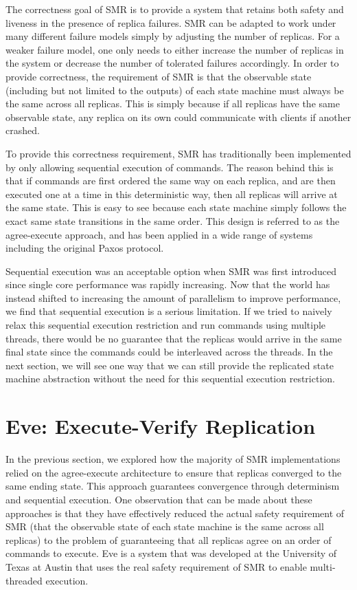 \documentclass[11pt, oneside]{report}
\begin{document}
The correctness goal of SMR is to provide a system that retains both safety and liveness in the presence of replica failures. 
SMR can be adapted to work under many different failure models simply by adjusting the number of replicas. 
For a weaker failure model, one only needs to either increase the number of replicas in the system or decrease the number of tolerated failures accordingly. 
In order to provide correctness, the requirement of SMR is that the observable state (including but not limited to the outputs) of each state machine must always be the same across all replicas. 
This is simply because if all replicas have the same observable state, any replica on its own could communicate with clients if another crashed.

To provide this correctness requirement, SMR has traditionally been implemented by only allowing sequential execution of commands. 
The reason behind this is that if commands are first ordered the same way on each replica, and are then executed one at a time in this deterministic way, then all replicas will arrive at the same state. 
This is easy to see because each state machine simply follows the exact same state transitions in the same order. 
This design is referred to as the agree-execute approach, and has been applied in a wide range of systems including the original Paxos protocol.

Sequential execution was an acceptable option when SMR was first introduced since single core performance was rapidly increasing. 
Now that the world has instead shifted to increasing the amount of parallelism to improve performance, we find that sequential execution is a serious limitation. 
If we tried to naively relax this sequential execution restriction and run commands using multiple threads, there would be no guarantee that the replicas would arrive in the same final state since the commands could be interleaved across the threads. 
In the next section, we will see one way that we can still provide the replicated state machine abstraction without the need for this sequential execution restriction. 
 

\section{Eve: Execute-Verify Replication}

In the previous section, we explored how the majority of SMR implementations relied on the agree-execute architecture to ensure that replicas converged to the same ending state. 
This approach guarantees convergence through determinism and sequential execution. 
One observation that can be made about these approaches is that they have effectively reduced the actual safety requirement of SMR (that the observable state of each state machine is the same across all replicas) to the problem of guaranteeing that all replicas agree on an order of commands to execute. 
Eve is a system that was developed at the University of Texas at Austin that uses the real safety requirement of SMR to enable multi-threaded execution.
\end{document}
